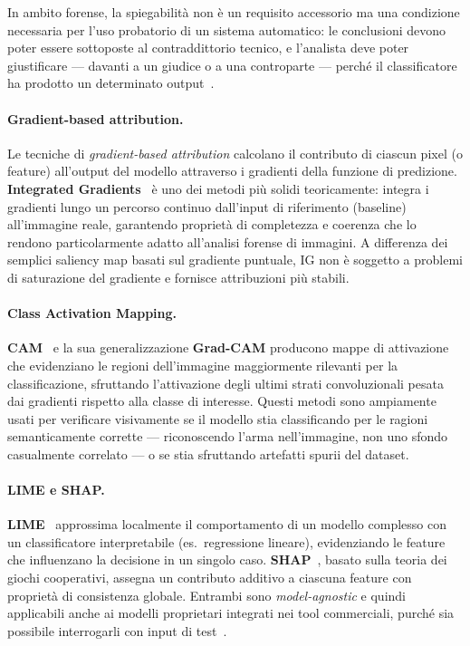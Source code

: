 In ambito forense, la spiegabilità non è un requisito accessorio ma una condizione necessaria per l'uso probatorio di un sistema automatico: le conclusioni devono poter essere sottoposte al contraddittorio tecnico, e l'analista deve poter giustificare — davanti a un giudice o a una controparte — perché il classificatore ha prodotto un determinato output~\cite{Doshi-Velez2017}.

\paragraph{Gradient-based attribution.}
Le tecniche di \textit{gradient-based attribution} calcolano il contributo di ciascun pixel (o feature) all'output del modello attraverso i gradienti della funzione di predizione. \textbf{Integrated Gradients}~\cite{Sundararajan2017} è uno dei metodi più solidi teoricamente: integra i gradienti lungo un percorso continuo dall'input di riferimento (baseline) all'immagine reale, garantendo proprietà di completezza e coerenza che lo rendono particolarmente adatto all'analisi forense di immagini. A differenza dei semplici saliency map basati sul gradiente puntuale, IG non è soggetto a problemi di saturazione del gradiente e fornisce attribuzioni più stabili.

\paragraph{Class Activation Mapping.}
\textbf{CAM}~\cite{Zhou2016} e la sua generalizzazione \textbf{Grad-CAM} producono mappe di attivazione che evidenziano le regioni dell'immagine maggiormente rilevanti per la classificazione, sfruttando l'attivazione degli ultimi strati convoluzionali pesata dai gradienti rispetto alla classe di interesse. Questi metodi sono ampiamente usati per verificare visivamente se il modello stia classificando per le ragioni semanticamente corrette — riconoscendo l'arma nell'immagine, non uno sfondo casualmente correlato — o se stia sfruttando artefatti spurii del dataset.

\paragraph{LIME e SHAP.}
\textbf{LIME}~\cite{Ribeiro2016} approssima localmente il comportamento di un modello complesso con un classificatore interpretabile (es.\ regressione lineare), evidenziando le feature che influenzano la decisione in un singolo caso. \textbf{SHAP}~\cite{Lundberg2017}, basato sulla teoria dei giochi cooperativi, assegna un contributo additivo a ciascuna feature con proprietà di consistenza globale. Entrambi sono \textit{model-agnostic} e quindi applicabili anche ai modelli proprietari integrati nei tool commerciali, purché sia possibile interrogarli con input di test~\cite{guidotti2018survey}.


